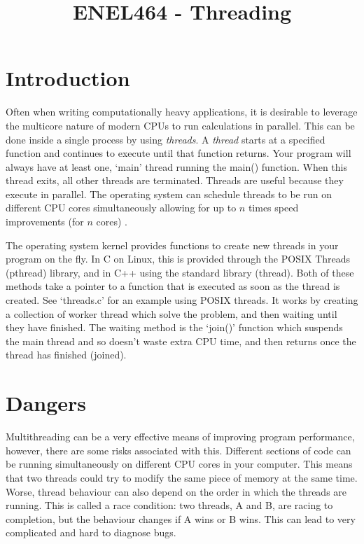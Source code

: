 \documentclass[a4paper,11pt]{article}
\begin{document}
\title{ \bf ENEL464 - Threading }
\author{}
\date{}
\maketitle


\section{Introduction}

Often when writing computationally heavy applications, it is desirable to
leverage the multicore nature of modern CPUs to run calculations in parallel.
This can be done inside a single process by using \emph{threads}. A
\emph{thread} starts at a specified function and continues to execute until that
function returns. Your program will always have at least one, `main' thread
running the main() function. When this thread exits, all other threads are
terminated. Threads are useful because they execute in parallel. The operating
system can schedule threads to be run on different CPU cores simultaneously
allowing for up to $n$ times speed improvements (for $n$ cores) \footnotemark.

The operating system kernel provides functions to create new threads in your
program on the fly. In C on Linux, this is provided through the POSIX Threads
(pthread) library, and in C++ using the standard library (thread). Both of these
methods take a pointer to a function that is executed as soon as the thread is
created. See `threads.c' for an example using POSIX threads. It works by
creating a collection of worker thread which solve the problem, and then waiting
until they have finished. The waiting method is the `join()' function which
suspends the main thread and so doesn't waste extra CPU time, and then returns
once the thread has finished (joined).



\section{Dangers}

Multithreading can be a very effective means of improving program performance,
however, there are some risks associated with this. Different sections of code
can be running simultaneously on different CPU cores in your computer. This
means that two threads could try to modify the same piece of memory at the same
time. Worse, thread behaviour can also depend on the order in which the threads
are running. This is called a race condition: two threads, A and B, are racing
to completion, but the behaviour changes if A wins or B wins. This can lead to
very complicated and hard to diagnose bugs.
\end{document}
